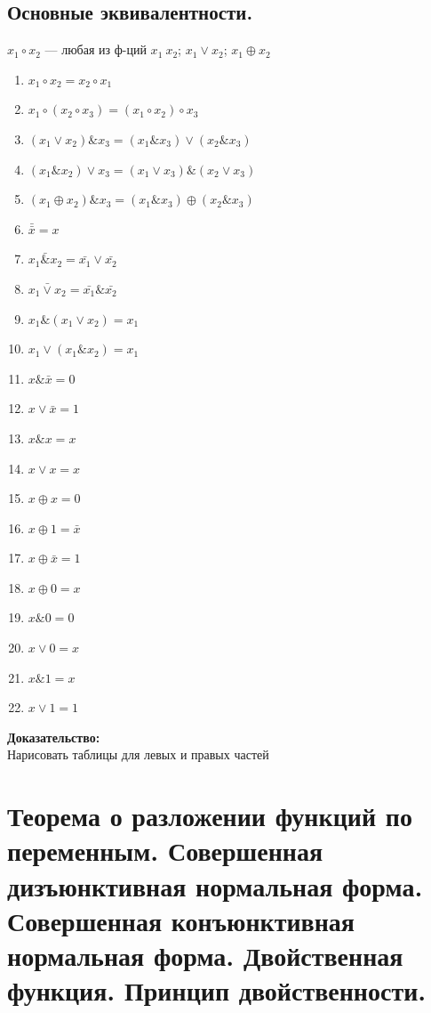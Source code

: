 \documentclass[12pt]{article}
\begin{document}
\subsection{Основные эквивалентности.}
	$x_1 \circ x_2$ — любая из ф-ций $x_1 \	 x_2$; $x_1 \vee x_2$; $x_1 \oplus x_2$
	\begin{enumerate}
		\item $x_1 \circ x_2 = x_2 \circ x_1$
		\item $x_1 \circ (x_2 \circ x_3) = (x_1 \circ x_2) \circ x_3$
		\item $(x_1 \vee x_2) \& x_3 = (x_1 \& x_3) \vee (x_2 \& x_3)$
		\item $(x_1 \& x_2) \vee x_3 = (x_1 \vee x_3) \& (x_2 \vee x_3)$
		\item $(x_1 \oplus x_2) \& x_3 = (x_1 \& x_3) \oplus (x_2 \& x_3)$
		\item $\bar{\bar{x}} = x$
		\item $\bar{x_1 \& x_2} = \bar{x_1} \vee \bar{x_2}$
		\item $\bar{x_1 \vee x_2} = \bar{x_1} \& \bar{x_2}$
		\item $x_1 \& (x_1 \vee x_2) = x_1$
		\item $x_1 \vee (x_1 \& x_2) = x_1$
		\item $x \& \bar{x} = 0$
		\item $x \vee \bar{x} = 1$
		\item $x \& x = x$
		\item $x \vee x = x$
		\item $x \oplus x = 0$
		\item $x \oplus 1 = \bar{x}$
		\item $x \oplus \bar{x} = 1$
		\item $x \oplus 0 = x$
		\item $x \& 0 = 0$
		\item $x \vee 0 = x$
		\item $x \& 1 = x$
		\item $x \vee 1 = 1$
	\end{enumerate}
	\textbf{Доказательство:}\\
	Нарисовать таблицы для левых и правых частей\\
	\qedsymbol
\section{Теорема о разложении функций по переменным. Совершенная дизъюнктивная нормальная форма. Совершенная конъюнктивная нормальная форма. Двойственная функция. Принцип двойственности.}
\end{document}
